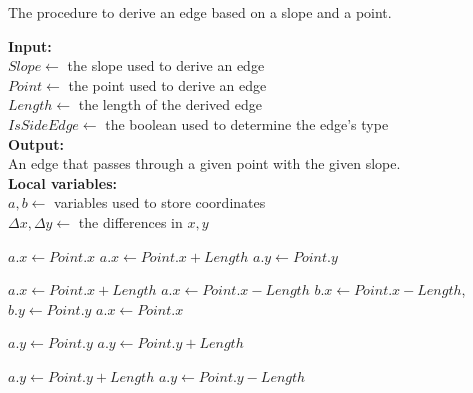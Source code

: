 \begin{algorithm}[tb!]
    \caption{The procedure to derive an edge based on a slope and a point.}\label{alg:derive corridor point}
    \textbf{Input:} \\
    $ Slope \gets $ the slope used to derive an edge \\
    $ Point \gets $ the point used to derive an edge \\
    $ Length \gets $ the length of the derived edge \\
    $ IsSideEdge \gets $ the boolean used to determine the edge's type \\

    \textbf{Output:} \\
    An edge that passes through a given point with the given slope. \\

    \textbf{Local variables:} \\
    $ a,b \gets $ variables used to store coordinates \\
    $ \Delta x, \Delta y \gets $ the differences in $ x, y $ \\

    \begin{algorithmic}[1]

                    \State $ a.x \gets Point.x $
                \Else
                    \State $ a.x \gets Point.x + Length $
                \EndIf
                \State $ a.y \gets Point.y $

                    \State $ a.x \gets Point.x + Length $
                \Else
                    \State $ a.x \gets Point.x - Length $
                \EndIf
                \State $ b.x \gets Point.x - Length $,~$ b.y \gets Point.y $
            \EndCase
                \State $ a.x \gets Point.x $

                    \State $ a.y \gets Point.y $
                \Else
                    \State $ a.y \gets Point.y + Length $
                \EndIf

                    \State $ a.y \gets Point.y + Length $
                \Else
                    \State $ a.y \gets Point.y - Length $
                \EndIf


\end{algorithmic}
\end{algorithm}
